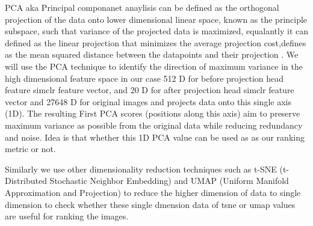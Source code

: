 PCA  aka Principal componanet anaylisis can be defined as the orthogonal projection of the data onto lower dimensional linear space, known as the principle subspace, such that variance of the projected data is maximized, equalantly it can defined as the linear projection that minimizes the average projection cost,defines as the mean squared distance between the datapoints and their projection \cite{bishop:2006:PRML}. We will use the PCA technique to identify the direction of maximum variance in the high dimensional feature space in our case 512 D for before projection head feature simclr feature vector, and 20 D for after projection head simclr feature vector and 27648 D for original images and projects data onto this single axis (1D). The resulting First PCA scores (positions along this axis) aim to preserve maximum variance as possible from the original data while reducing redundancy and noise.  Idea is that whether this 1D PCA value can be used as as our ranking metric or not. 

Similarly we use other dimensionality reduction techniques such as  t-SNE (t-Distributed Stochastic Neighbor Embedding)  and UMAP (Uniform Manifold Approximation and Projection) to reduce the higher dimension of data to single dimension to check whether these single dmension data of tsne or umap values are useful for ranking  the images. 

